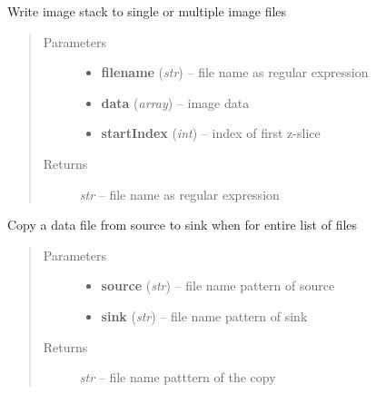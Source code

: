 \documentclass[letterpaper,10pt,english]{sphinxmanual}
\begin{document}

\begin{fulllineitems}
\label{api/ClearMap.IO:ClearMap.IO.FileList.writeData}
Write image stack to single or multiple image files
\begin{quote}\begin{description}
\item[{Parameters}] \leavevmode\begin{itemize}
\item {} 
\textbf{filename} (\emph{str}) --
file name as regular expression

\item {} 
\textbf{data} (\emph{array}) --
image data

\item {} 
\textbf{startIndex} (\emph{int}) --
index of first z-slice

\end{itemize}

\item[{Returns}] \leavevmode
\emph{str} --
file name as regular expression

\end{description}\end{quote}

\end{fulllineitems}


\begin{fulllineitems}
\label{api/ClearMap.IO:ClearMap.IO.FileList.copyData}
Copy a data file from source to sink when for entire list of files
\begin{quote}\begin{description}
\item[{Parameters}] \leavevmode\begin{itemize}
\item {} 
\textbf{source} (\emph{str}) --
file name pattern of source

\item {} 
\textbf{sink} (\emph{str}) --
file name pattern of sink

\end{itemize}

\item[{Returns}] \leavevmode
\emph{str} --
file name patttern of the copy

\end{description}\end{quote}

\end{fulllineitems}
\end{document}
